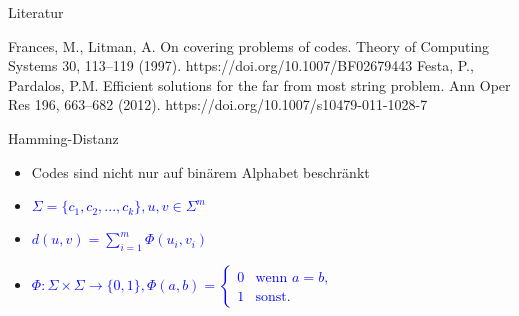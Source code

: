 \documentclass[10pt, aspectratio=169]{beamer}
\begin{document}
\begin{frame}{Literatur}
\begin{thebibliography}{9}

 Frances, M., Litman, A. On covering problems of codes. Theory of Computing Systems 30, 113–119 (1997). https://doi.org/10.1007/BF02679443
 Festa, P., Pardalos, P.M. Efficient solutions for the far from most string problem. Ann Oper Res 196, 663–682 (2012). https://doi.org/10.1007/s10479-011-1028-7

\end{thebibliography}


\end{frame}

\begin{frame}[label = {Ham}]{Hamming-Distanz}
\addtocounter{framenumber}{-1}
\begin{itemize}
    \item Codes sind nicht nur auf binärem Alphabet beschränkt
    \item \textcolor{blue}{$\Sigma=\{c_1,c_2,...,c_k\}, u,v \in \Sigma^m$}
    \item \textcolor{blue}{$d(u,v)=\sum_{i=1}^m\Phi(u_i,v_i)$}
    \item \textcolor{blue}{$\Phi: \Sigma \times \Sigma \rightarrow \{0,1\}, \Phi(a,b) =
    \begin{cases}
0 & \text{wenn } a = b,\\
1 & \text{sonst}.
\end{cases}$}
\end{itemize}
\end{frame}
\end{document}
